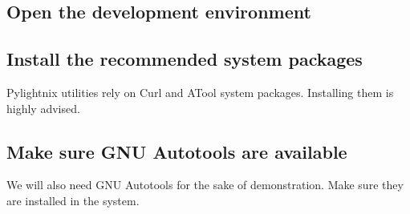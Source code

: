 \subsection{Open the development environment}

\subsection{Install the recommended system packages}

Pylightnix utilities rely on Curl and ATool system packages. Installing them
is highly advised.


\subsection{Make sure GNU Autotools are available}

We will also need GNU Autotools for the sake of demonstration. Make sure they
are installed in the system.


